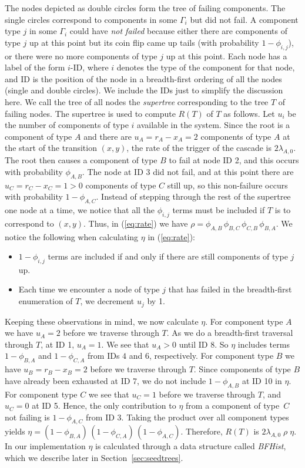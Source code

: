 \documentclass[12pt]{article}
\newcommand{\changed}[1]{#1}
\newcommand{\changed}[1]{\textcolor{red}{#1}}
\newcommand{\varName}[1]{\textrm{\it#1}}
\begin{document}
The nodes depicted as double circles form the tree of failing components. The single circles correspond to components in some $\Gamma_i$ but did not fail.  A component type $j$ in some $\Gamma_i$ could have \textit{not failed} because either there are components of type $j$ up at this point but its coin flip came up tails (with probability $1 - \phi_{i, j}$), or there were no more components of type $j$ up at this point. Each node has a label of the form $i$-ID, where $i$ denotes the type of the component for that node, and ID is the position of the node in a breadth-first ordering of all the nodes (single and double circles). We include the IDs just to simplify the discussion here. We call the tree of all nodes the \textit{supertree} corresponding to the tree $T$ of failing nodes. The supertree is used to compute $R(T)$ of $T$ as follows. Let $u_i$ be the number of components of type $i$ available in the system. Since the root is a component of type $A$ and there are $u_A = r_A - x_A = 2$ components of type $A$ at the start of the transition $(x, y)$, the rate of the trigger of the cascade is $2 \lambda_{A, 0}$. The root then causes a component of type $B$ to fail at node ID 2, and this occurs with probability $\phi_{A, B}$. The node at ID 3 did not fail, and at this point there are $u_C = r_C - x_C = 1 > 0$ components of type $C$ still up, so this non-failure occurs with probability $1 - \phi_{A,C}$. Instead of stepping through the \changed{rest of the} supertree one node at a time, we notice that all the $\phi_{i, j}$ terms must be included if $T$ is to correspond to $(x, y)$. Thus, in (\ref{eq:rate}) we have $\rho = \phi_{A, B} \, \phi_{B, C} \, \phi_{C, B} \, \phi_{B, A}$.
We notice the following when calculating $\eta$ in (\ref{eq:rate}): 
\begin{itemize} 
\item $1 - \phi_{i, j}$ terms are included if and only if there are still components of type $j$ up.
\item Each time we encounter a node of type $j$ that has failed in the breadth-first enumeration of $T$, we decrement $u_j$ by 1. 
\end{itemize}
Keeping these observations in mind, we now calculate $\eta$. For component type $A$ we have $u_A = 2$ before we traverse through $T$. As we do a breadth-first traversal through $T$, at ID 1, $u_A = 1$. We see that $u_A > 0$ until ID 8. So $\eta$ includes terms $1 - \phi_{B, A}$ and $1 - \phi_{C, A}$ from IDs $4$ and $6$, respectively. For component type $B$ we have $u_B = r_B - x_B  = 2$ before we traverse through $T$. Since components of type $B$ have already been exhausted at ID 7, we do not include $1 - \phi_{A, B}$ at ID 10 in $\eta$. For component type $C$ we see that $u_C = 1$ before we traverse through $T$, and $u_C = 0$ at ID 5. Hence, the only contribution to $\eta$ from a component of type~$C$ not failing is $1 - \phi_{A, C}$ from ID 3. Taking the product over all component types yields $\eta = (1 - \phi_{B, A}) \, (1 - \phi_{C, A}) \, (1 - \phi_{A,C})$. Therefore, $R(T)$ is $2 \lambda_{A, 0} \; \rho \; \eta$. In our implementation $\eta$ is calculated through a data structure called \varName{BFHist}, which we describe later in Section~\ref{sec:seedtrees}.
\end{document}
